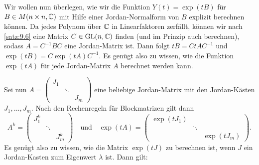 \begin{anwendung}
	\label{anw:10.16}
	Wir wollen nun überlegen, wie wir die Funktion $Y(t) = \exp(tB)$ für $B \in M(n \times n,\mathbb{C})$ mit Hilfe einer Jordan-Normalform von $B$ explizit berechnen können.
	Da jedes Polynom über $\mathbb{C}$ in Linearfaktoren zerfällt, können wir nach \autoref{satz:9.6} eine Matrix $C \in \operatorname{GL}(n,\mathbb{C})$ finden (und im Prinzip auch berechnen), sodass $A = C^{-1}BC$ eine Jordan-Matrix ist.
	Dann folgt $tB = CtAC^{-1}$ und $\exp(tB) = C \exp(tA)C^{-1}$.
	Es genügt also zu wissen, wie die Funktion $\exp(tA)$ für jede Jordan-Matrix $A$ berechnet werden kann.
	
	Sei nun $A = \begin{pmatrix}
	J_1 &        &  \\
	& \ddots &  \\
	&        & J_m
	\end{pmatrix}$ eine beliebige Jordan-Matrix mit den Jordan-Kästen $J_1,\dots,J_m$.
	Nach den Rechenregeln für Blockmatrizen gilt dann
	\[
	A^{k} = \begin{pmatrix}
	J_1^{k} &        &  \\
	& \ddots &  \\
	&        & J_m^{k}
	\end{pmatrix} \quad \text{und} \quad \exp(tA) =
	\begin{pmatrix}
	\exp(tJ_1) &        &  \\
	& \ddots &  \\
	&        & \exp(tJ_m)
	\end{pmatrix}.
	\]
	Es genügt also zu wissen, wie die Matrix $\exp(tJ)$ zu berechnen ist, wenn $J$ ein Jordan-Kasten zum Eigenwert $\lambda$ ist.
	Dann gilt:
	

\end{anwendung}
